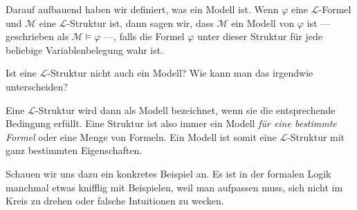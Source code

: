 \begin{spoken-clean}[00:09:40 - 00:10:38]
Darauf aufbauend haben wir definiert, was ein Modell ist. Wenn $\varphi$ eine $\mathcal{L}$-Formel und $\mathcal{M}$ eine $\mathcal{L}$-Struktur ist, dann sagen wir, dass $\mathcal{M}$ ein Modell von $\varphi$ ist --- geschrieben als $\mathcal{M} \models \varphi$ ---, falls die Formel $\varphi$ unter dieser Struktur für jede beliebige Variablenbelegung wahr ist.
\end{spoken-clean}

\begin{math-stroke}
\end{math-stroke}

\begin{student-interaction}
Ist eine $\mathcal{L}$-Struktur nicht auch ein Modell? Wie kann man das irgendwie unterscheiden?
\end{student-interaction}

\begin{spoken-clean}[continued]
Eine $\mathcal{L}$-Struktur wird dann als Modell bezeichnet, wenn sie die entsprechende Bedingung erfüllt. Eine Struktur ist also immer ein Modell \emph{für eine bestimmte Formel} oder eine Menge von Formeln. Ein Modell ist somit eine $\mathcal{L}$-Struktur mit ganz bestimmten Eigenschaften.
\end{spoken-clean}

\begin{ai-global-state-checkpoint-invisible-content}
\end{ai-global-state-checkpoint-invisible-content}

\begin{spoken-clean}[00:11:55 - 00:12:15]
Schauen wir uns dazu ein konkretes Beispiel an. Es ist in der formalen Logik manchmal etwas knifflig mit Beispielen, weil man aufpassen muss, sich nicht im Kreis zu drehen oder falsche Intuitionen zu wecken.
\end{spoken-clean}

